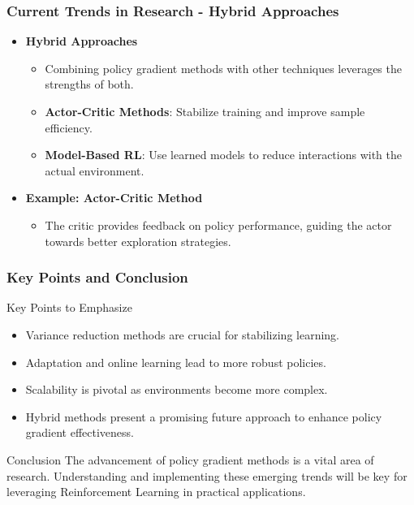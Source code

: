 \documentclass{beamer}
\begin{document}
\begin{frame}[fragile]
    \frametitle{Current Trends in Research - Hybrid Approaches}
    \begin{itemize}
        \item \textbf{Hybrid Approaches}
        \begin{itemize}
            \item Combining policy gradient methods with other techniques leverages the strengths of both.
            \item \textbf{Actor-Critic Methods}: Stabilize training and improve sample efficiency.
            \item \textbf{Model-Based RL}: Use learned models to reduce interactions with the actual environment.
        \end{itemize}
        \item \textbf{Example: Actor-Critic Method}
        \begin{itemize}
            \item The critic provides feedback on policy performance, guiding the actor towards better exploration strategies.
        \end{itemize}
    \end{itemize}
\end{frame}

\begin{frame}[fragile]
    \frametitle{Key Points and Conclusion}
    \begin{block}{Key Points to Emphasize}
        \begin{itemize}
            \item Variance reduction methods are crucial for stabilizing learning.
            \item Adaptation and online learning lead to more robust policies.
            \item Scalability is pivotal as environments become more complex.
            \item Hybrid methods present a promising future approach to enhance policy gradient effectiveness.
        \end{itemize}
    \end{block}
    \begin{block}{Conclusion}
        The advancement of policy gradient methods is a vital area of research. Understanding and implementing these emerging trends will be key for leveraging Reinforcement Learning in practical applications.
    \end{block}
\end{frame}
\end{document}
